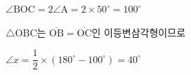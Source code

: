 $\angle\mathrm{BOC} = 2\angle\mathrm{A} = 2\times 50^\circ = 100^\circ$

$\triangle\mathrm{OBC}$는 $\overline{\mathrm{OB}} = \overline{\mathrm{OC}}$인 이등변삼각형이므로

$\angle x = \dfrac{1}{2}\times (180^\circ - 100^\circ) = 40^\circ$
